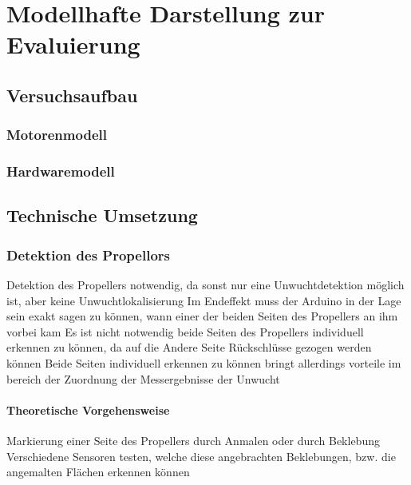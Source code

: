 
\chapter{Modellhafte Darstellung zur Evaluierung}

\section{Versuchsaufbau}

\subsection{Motorenmodell}

\subsection{Hardwaremodell}

\section{Technische Umsetzung}

\subsection{Detektion des Propellors}
Detektion des Propellers notwendig, da sonst nur eine Unwuchtdetektion möglich ist, aber keine Unwuchtlokalisierung
Im Endeffekt muss der Arduino in der Lage sein exakt sagen zu können, wann einer der beiden Seiten des Propellers an ihm vorbei kam
Es ist nicht notwendig beide Seiten des Propellers individuell erkennen zu können, da auf die Andere Seite Rückschlüsse gezogen werden können
Beide Seiten individuell erkennen zu können bringt allerdings vorteile im bereich der Zuordnung der Messergebnisse der Unwucht

\subsubsection*{Theoretische Vorgehensweise}
Markierung einer Seite des Propellers durch Anmalen oder durch Beklebung
Verschiedene Sensoren testen, welche diese angebrachten Beklebungen, bzw. die angemalten Flächen erkennen können

